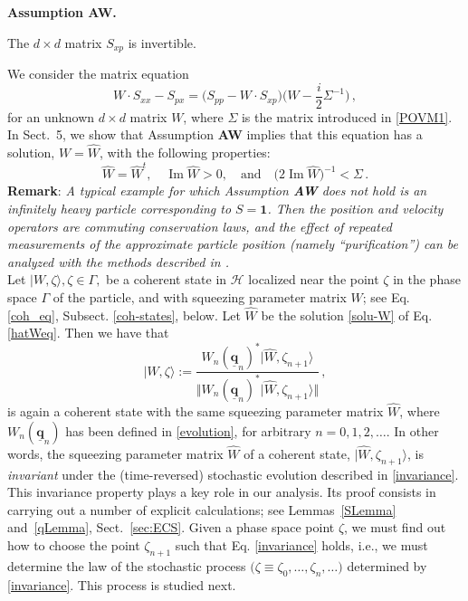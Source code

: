 \documentclass[12pt]{article}
\makeatletter
\def\namedlabel#1#2{\begingroup
	\def\@currentlabel{#2}%
	\label{#1}\endgroup
}
\newenvironment{assumption}[2]{\par\vspace{1em}\noindent\textbf{Assumption #1.}\namedlabel{#2}{\textbf{#1}}}{\par\vspace{1em}}
\newcommand{\ket}[1]{|{#1}\rangle}
\renewcommand{\Im}{\operatorname{Im}}
\makeatother
\begin{document}
\begin{assumption}{AW}{ass:W} 
The $d\times d$ matrix $S_{xp}$ is invertible.
\end{assumption}

We consider the matrix equation
\begin{equation}\label{hatWeq}
W\cdot S_{xx}-S_{px}= \big(S_{pp}-W\cdot S_{xp}\big)\big( W- \frac{i}{2} \Sigma^{-1}\big)\,,
\end{equation}       
for an unknown $d\times d$ matrix $W$, where $\Sigma$ is the matrix introduced  in \eqref{POVM1}.
In Sect.~5, we show that Assumption {\bf{AW}} implies that this equation has a solution, $W=\widehat{W}$, with the following properties:
\begin{equation}\label{solu-W}
 \widehat{W}=\widehat{W}^{t}, \quad \Im{\widehat{W}} >0, \quad \text{and}\quad \big(2 \Im{\widehat{W}}\big)^{-1} < \Sigma\,.
\end{equation}
\noindent
{\bf{Remark}}: \textit{A typical example for which Assumption {\bf{AW}} does not hold is an infinitely heavy particle 
corresponding to $S=\mathbf{1}$. Then the position and velocity operators are commuting conservation laws, and the 
effect of repeated measurements of the approximate particle position (namely ``purification'') can be analyzed with the 
methods described in \cite{BCFFS}.} \\

Let $\vert W, \zeta \rangle, \zeta \in \Gamma,$ be a coherent state in $\mathcal{H}$ localized near the point $\zeta$ 
in the phase space $\Gamma$ of the particle, and with squeezing parameter matrix $W$; see Eq. \eqref{coh_eq}, 
Subsect. \ref{coh-states}, below. Let $\widehat{W}$ be the solution \eqref{solu-W} of Eq. \eqref{hatWeq}. Then we have that
\begin{equation}\label{invariance}
 \vert \widehat{W}, \zeta \rangle:= \frac{W_{n}(\underline{\mathbf{q}}_{n})^{*}\ket{\widehat W,\zeta_{n+1}}}{\Vert W_{n}(\underline{\mathbf{q}}_{n})^{*}\ket{\widehat W,\zeta_{n+1}} \Vert }\,, 
\end{equation}
is again a coherent state with the same squeezing parameter matrix $\widehat{W}$, where 
$W_{n}(\underline{\mathbf{q}}_{n})$ has been defined in \eqref{evolution}, for arbitrary $n=0,1,2, \dots$. 
In other words, the squeezing parameter matrix $\widehat{W}$ of a coherent state, 
$\vert \widehat{W}, \zeta_{n+1} \rangle$, is \textit{invariant} under the (time-reversed) stochastic evolution described in 
\eqref{invariance}. This invariance property plays a key role in our analysis. Its proof consists in carrying out a number of 
explicit calculations; see Lemmas~\ref{SLemma} and~\ref{qLemma},
Sect.~\ref{sec:ECS}. Given a phase space point $\zeta$, we must find out how to choose the point $\zeta_{n+1}$ 
such that Eq. \eqref{invariance} holds, i.e., we must determine the law of the stochastic process 
$\big(\zeta \equiv \zeta_0, \dots, \zeta_n, \dots \big)$ determined by \eqref{invariance}. This process is studied next.\\
\end{document}
